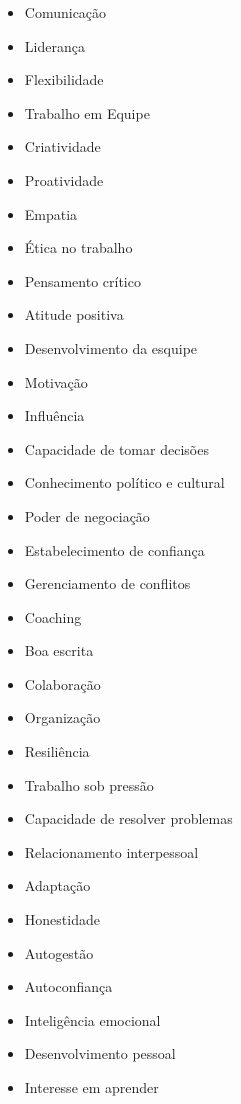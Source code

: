 \begin{itemize}
	\item Comunicação
	\item Liderança
	\item Flexibilidade
	\item Trabalho em Equipe
	\item Criatividade
	\item Proatividade
	\item Empatia
	\item Ética no trabalho
	\item Pensamento crítico
	\item Atitude positiva
	\item Desenvolvimento da esquipe
	\item Motivação
	\item Influência
	\item Capacidade de tomar decisões
	\item Conhecimento político e cultural
	\item Poder de negociação
	\item Estabelecimento de confiança
	\item Gerenciamento de conflitos
	\item Coaching
	\item Boa escrita
	\item Colaboração
	\item Organização
	\item Resiliência
	\item Trabalho sob pressão
	\item Capacidade de resolver problemas
	\item Relacionamento interpessoal
	\item Adaptação
	\item Honestidade
	\item Autogestão
	\item Autoconfiança
	\item Inteligência emocional
	\item Desenvolvimento pessoal
	\item Interesse em aprender
\end{itemize}